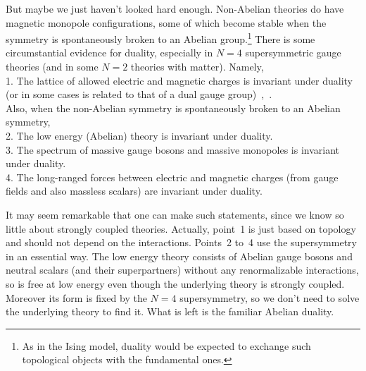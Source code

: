 But maybe we just haven't looked hard enough.
Non-Abelian theories do have magnetic monopole configurations,
some of which become stable when the symmetry is spontaneously broken
to an Abelian group.\footnote{As in the Ising model, duality would be
expected to exchange such topological objects with the fundamental
ones.}
There is some circumstantial
evidence for duality, especially in $N=4$ supersymmetric
gauge theories (and in some $N=2$ theories with matter).
Namely,\\[3pt]
1. The lattice of allowed electric and magnetic charges is invariant
under duality (or in some cases is related to that of a dual gauge
group)~\cite{MO},~\cite{GNO}.\\[3pt]
Also, when the non-Abelian symmetry is spontaneously broken to an
Abelian symmetry,\\[3pt]
2. The low energy (Abelian) theory is invariant under duality.\\[3pt]
3. The spectrum of massive gauge bosons and massive monopoles is
invariant under duality.\\[3pt]
4. The long-ranged forces between electric and magnetic charges
(from gauge fields and also massless scalars) are invariant under
duality.

It may seem remarkable that one can make such statements, since we
know so little about strongly coupled theories.  Actually, point~1
is just based on topology and should not depend on the interactions.
Points~2 to~4 use the supersymmetry in an essential way.  The low
energy theory consists of Abelian gauge bosons and neutral scalars
(and their superpartners) without any renormalizable interactions,
so is free at low energy even though the underlying theory is strongly
coupled.  Moreover its form is fixed by the $N=4$ supersymmetry,
so we don't need to solve the underlying theory to find it.  What is
left is the familiar Abelian duality.

